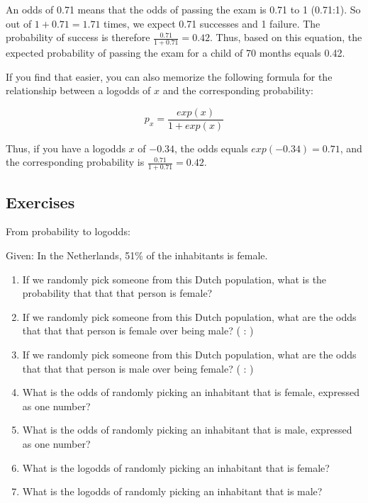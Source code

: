 \documentclass[]{book}\usepackage[]{graphicx}\usepackage[]{color}
\begin{document}
An odds of 0.71 means that the odds of passing the exam is 0.71 to 1 (0.71:1). So out of $1 + 0.71= 1.71$ times, we expect 0.71 successes and 1 failure. The probability of success is therefore $\frac{0.71}{1+0.71} = 0.42$. Thus, based on this equation, the expected probability of passing the exam for a child of 70 months equals 0.42.

If you find that easier, you can also memorize the following formula for the relationship between a logodds of $x$ and the corresponding probability:


\begin{equation}
\label{eq:logistic1}
p_x = \frac{exp(x)}{1+exp(x)}
\end{equation}

Thus, if you have a logodds $x$ of $-0.34$, the odds equals $exp(-0.34)=0.71$, and
the corresponding probability is $\frac{0.71}{1+0.71} = 0.42$.


\subsection{Exercises}

From probability to logodds:

Given:
In the Netherlands, 51\% of the inhabitants is female.
\begin{enumerate}

\item
If we randomly pick someone from this Dutch population, what is the probability that that that person is female?


\item
If we randomly pick someone from this Dutch population, what are the odds that that that person is female over being male? ( : )

\item
If we randomly pick someone from this Dutch population, what are the odds that that that person is male over being female? ( : )

\item
What is the odds of randomly picking an inhabitant that is female, expressed as one number?

\item
What is the odds of randomly picking an inhabitant that is male, expressed as one number?


\item
What is the logodds of randomly picking an inhabitant that is female?

\item
What is the logodds of randomly picking an inhabitant that is male?


\end{enumerate}
\end{document}
